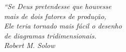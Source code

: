 \begin{epigrafe}
    \vspace*{\fill}
	\begin{flushright}
		\textit{``Se Deus pretendesse que houvesse\\
        mais de dois fatores de produção,\\
        Ele teria tornado mais fácil o desenho\\
        de diagramas tridimensionais.\\
        Robert M. Solow
		}
	\end{flushright}
\end{epigrafe}
